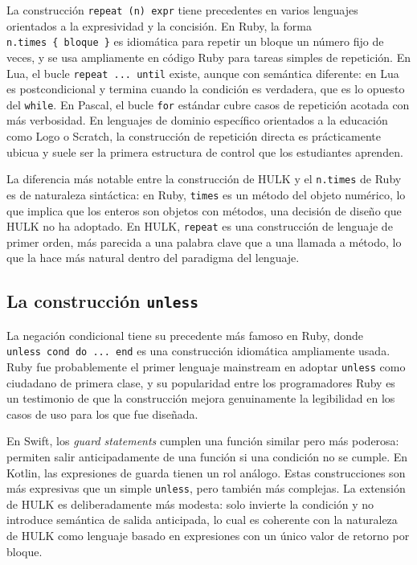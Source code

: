 \documentclass[12pt, a4paper]{article}
\begin{document}
La construcción \texttt{repeat~(n)~expr} tiene precedentes en varios lenguajes orientados a la expresividad y la concisión. En Ruby, la forma \texttt{n.times~\{~bloque~\}} es idiomática para repetir un bloque un número fijo de veces, y se usa ampliamente en código Ruby para tareas simples de repetición. En Lua, el bucle \texttt{repeat~...~until} existe, aunque con semántica diferente: en Lua es postcondicional y termina cuando la condición es verdadera, que es lo opuesto del \texttt{while}. En Pascal, el bucle \texttt{for} estándar cubre casos de repetición acotada con más verbosidad. En lenguajes de dominio específico orientados a la educación como Logo o Scratch, la construcción de repetición directa es prácticamente ubicua y suele ser la primera estructura de control que los estudiantes aprenden.

La diferencia más notable entre la construcción de HULK y el \texttt{n.times} de Ruby es de naturaleza sintáctica: en Ruby, \texttt{times} es un método del objeto numérico, lo que implica que los enteros son objetos con métodos, una decisión de diseño que HULK no ha adoptado. En HULK, \texttt{repeat} es una construcción de lenguaje de primer orden, más parecida a una palabra clave que a una llamada a método, lo que la hace más natural dentro del paradigma del lenguaje.

\subsection{La construcción \texttt{unless}}

La negación condicional tiene su precedente más famoso en Ruby, donde \texttt{unless~cond~do~...~end} es una construcción idiomática ampliamente usada. Ruby fue probablemente el primer lenguaje mainstream en adoptar \texttt{unless} como ciudadano de primera clase, y su popularidad entre los programadores Ruby es un testimonio de que la construcción mejora genuinamente la legibilidad en los casos de uso para los que fue diseñada.

En Swift, los \emph{guard statements} cumplen una función similar pero más poderosa: permiten salir anticipadamente de una función si una condición no se cumple. En Kotlin, las expresiones de guarda tienen un rol análogo. Estas construcciones son más expresivas que un simple \texttt{unless}, pero también más complejas. La extensión de HULK es deliberadamente más modesta: solo invierte la condición y no introduce semántica de salida anticipada, lo cual es coherente con la naturaleza de HULK como lenguaje basado en expresiones con un único valor de retorno por bloque.
\end{document}
